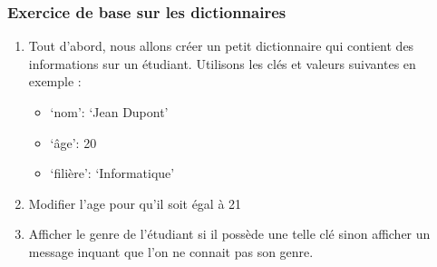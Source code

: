 \documentclass[letterpaper,10pt,english]{sphinxhowto}
\begin{document}
\subsubsection{Exercice de base sur les dictionnaires}
\label{\detokenize{cours3_conteneur_corr_exercices:exercice-de-base-sur-les-dictionnaires}}\begin{enumerate}
%
\item {} 
\sphinxAtStartPar
Tout d’abord, nous allons créer un petit dictionnaire qui contient des informations sur un étudiant. Utilisons les clés et valeurs suivantes en exemple :
\begin{itemize}
\item {} 
\sphinxAtStartPar
‘nom’: ‘Jean Dupont’

\item {} 
\sphinxAtStartPar
‘âge’: 20

\item {} 
\sphinxAtStartPar
‘filière’: ‘Informatique’

\end{itemize}

\item {} 
\sphinxAtStartPar
Modifier l’age pour qu’il soit égal à 21

\item {} 
\sphinxAtStartPar
Afficher le genre de l’étudiant si il possède une telle clé sinon afficher un message inquant que l’on ne connait pas son genre.

\end{enumerate}

\begin{sphinxVerbatim}[commandchars=\\\{\}]
    
            
            

\PYG{p}{[}\PYG{p}{]}  

   
     \PYG{p}{[}\PYG{p}{]}
    
\end{sphinxVerbatim}
\end{document}
